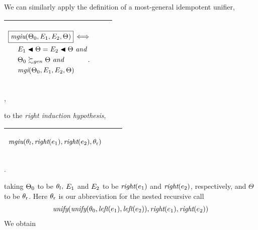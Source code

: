 \documentclass[runningheads]{llncs}
\DeclareMathOperator{\uand}{\emph{and}\,}
\DeclareMathOperator{\uiff}{\iff}
\DeclareMathOperator{\unify}{\emph{unify}}
\DeclareMathOperator{\lef}{\emph{left}}
\DeclareMathOperator{\rig}{\emph{right}}
\DeclareMathOperator{\mgi}{\emph{mgi}}
\DeclareMathOperator{\mgiu}{\emph{mgiu}}
\DeclareMathOperator{\uu}{\thet{r}}
\begin{document}
We can similarly apply the definition of a most-general idempotent unifier,
\begin{center}
    

  \begin{tabular}{|m{}|m{}||m{}|}
\hline
 \begin{center} 
${\begin{aligned} 
 &\boxed{\mgiu(\Thet{0}, \E{1}, \E{2}, \Theta)} \uiff \\
 &\quad\begin{aligned}
&\E{1} \apply \Theta = \E{2} \apply \Theta \, \uand 
 \\
 \,\, & \Thet{0} \moregen \Theta \, \uand
\\
  \,\, & {\mgi}(\Thet{0}, \E{1}, \E{2}, \Theta)
\end{aligned}.\end{aligned}}$\hspace{1cm} 
\end{center}& &  \\  \hline
\end{tabular},
\end{center}
to the \emph{right induction hypothesis}, 
 \begin{center}
  \begin{tabular}{|m{}|m{}||m{}|}
  \hline
  \begin{center}
{$\mgiu(\thet{l},\rig(\e{1}),\rig(\e{2}), \uu) $}
 \end{center}  
& & \\
\hline
\end{tabular}.
\end{center}
taking $\Theta_{0}$ to be $\theta_{l},$ $E_{1}$ and $E_{2}$ to be $\rig(\e{1})$ and $\rig(\e{2})$, respectively, and $\Theta$ to be  $\uu$.
Here $\uu$ is our abbreviation for the nested recursive call
\[\begin{aligned}
\unify(
\begin{aligned}
   \unify(\thet{0}, 
  \lef(\e{1}),  
 \lef(\e{2})),
   \end{aligned} 
\rig(\e{1}), 
\rig(\e{2}))
 \end{aligned} \]
 We obtain 
\end{document}
